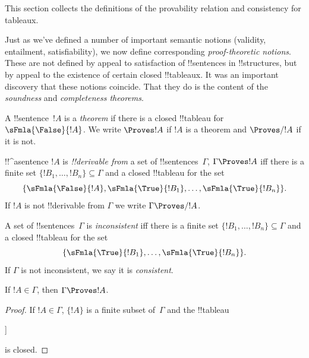       

\begin{editorial}
This section collects the definitions of the provability relation
and consistency for tableaux.
\end{editorial}

\begin{explain}
Just as we've defined a number of important semantic notions
(validity, entailment, satisfiability), we now define corresponding
\emph{proof-theoretic notions}.  These are not defined by appeal to
satisfaction of !!{sentence}s in !!{structure}s, but by appeal to the
existence of certain closed !!{tableau}x.  It was an important
discovery that these notions coincide.  That they do is the content of
the \emph{soundness} and \emph{completeness theorems}.
\end{explain}


\begin{defn}[Theorems]
A !!{sentence}~$!A$ is a \emph{theorem} if there is a closed
!!{tableau} for~$\sFmla{\False}{!A}$.  We write $\Proves !A$ if $!A$
is a theorem and $\Proves/ !A$ if it is not.
\end{defn}

\begin{defn}[!!^{derivability}]
!!^a{sentence} $!A$ is \emph{!!{derivable} from} a set of
!!{sentence}s~$\Gamma$, $\Gamma \Proves !A$ iff there is a
finite set $\{!B_1, \dots, !B_n\} \subseteq \Gamma$
and a closed !!{tableau} for the set
\[
\{
  \sFmla{\False}{!A},
  \sFmla{\True}{!B_1}, \dots,
  \sFmla{\True}{!B_n}
  \}.
\]
If $!A$ is not !!{derivable} from $\Gamma$ we write $\Gamma \Proves/
!A$.
\end{defn}

\begin{defn}[Consistency]
A set of !!{sentence}s~$\Gamma$ is \emph{inconsistent} iff there is a
finite set $\{!B_1, \dots, !B_n\} \subseteq \Gamma$ and a closed
!!{tableau} for the set
\[
\{
  \sFmla{\True}{!B_1}, \dots,
  \sFmla{\True}{!B_n}  
  \}.
\]
If $\Gamma$ is not inconsistent, we say it is \emph{consistent}.
\end{defn}

\begin{prop}[Reflexivity]
If $!A \in \Gamma$, then $\Gamma \Proves !A$.
\end{prop}

\begin{proof}
If $!A \in \Gamma$, $\{!A\}$ is a finite subset of~$\Gamma$ and the !!{tableau}
\begin{oltableau}
  [\sFmla{\False}{\formula{A}}, just = \TAss
    [\sFmla{\True}{\formula{A}}, just = \TAss,close]
  ]
\end{oltableau}
is closed.
\end{proof}
  

